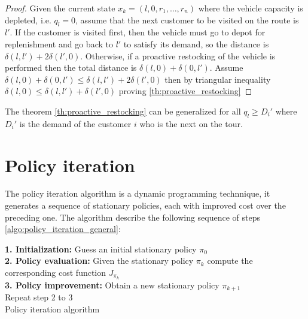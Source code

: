 \begin{proof}
Given the current state $x_k=(l,0,r_1,\ldots, r_n)$ where the vehicle capacity is depleted, i.e. $q_l = 0$, assume that the next customer to be visited on the route is $l'$. If the customer is visited first, then the vehicle must go to depot for replenishment and go back to $l'$ to satisfy its demand, so the distance is $\delta(l,l')+2\delta(l',0)$. Otherwise, if a proactive restocking of the vehicle is performed then the total distance is $\delta(l,0)+\delta(0,l')$.
Assume $\delta(l,0)+\delta(0,l') \leq \delta(l,l')+2\delta(l',0)$ then by triangular inequality $\delta(l,0) \leq \delta(l,l')+\delta(l',0)$ proving \ref{th:proactive_restocking}
\end{proof}

\begin{lemma}%
 The theorem \ref{th:proactive_restocking} can be generalized for all $q_l \geq D_i'$ where $D_i'$ is the demand of the customer $i$ who is the next on the tour.
\end{lemma}











\section{Policy iteration}

The policy iteration algorithm is a dynamic programming technnique, it generates a sequence of stationary policies, each with improved cost over the preceding one. The algorithm describe the following sequence of steps \ref{algo:policy_iteration_general}:

\begin{algorithm}
 \textbf{1. Initialization:} Guess an initial stationary policy $\pi_0$\\
 \textbf{2. Policy evaluation:} Given the stationary policy $\pi_k$ compute the corresponding cost function $J_{\pi_k}$\\
 \textbf{3. Policy improvement:} Obtain a new stationary policy $\pi_{k+1}$\\
 Repeat step 2 to 3\\
 \caption{Policy iteration algorithm}\label{algo:policy_iteration_general}
\end{algorithm}

